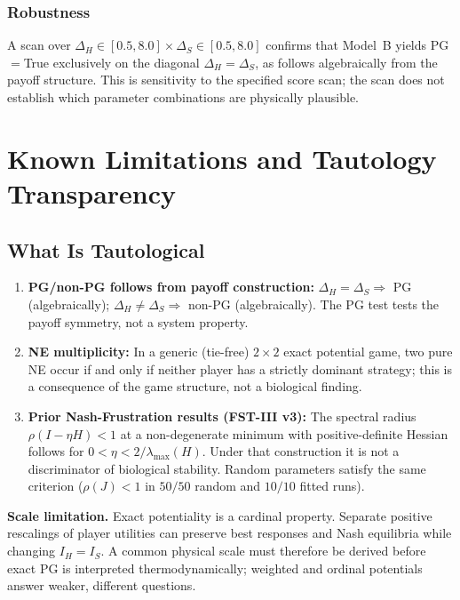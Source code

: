 \documentclass[12pt,a4paper]{article}
\begin{document}
\subsubsection{Robustness}

A scan over $\Delta_H \in [0.5, 8.0] \times \Delta_S \in [0.5, 8.0]$
confirms that Model~B yields PG$=$True exclusively on the diagonal
$\Delta_H = \Delta_S$, as follows algebraically from the payoff
structure. This is sensitivity to the specified score scan; the scan
does not establish which parameter combinations are physically
plausible.


\section{Known Limitations and Tautology Transparency}
\label{sec:tautology}

\subsection{What Is Tautological}

\begin{enumerate}
  \item \textbf{PG/non-PG follows from payoff construction:}
    $\Delta_H = \Delta_S \Rightarrow$ PG (algebraically);
    $\Delta_H \neq \Delta_S \Rightarrow$ non-PG (algebraically).
    The PG test tests the payoff symmetry, not a system property.

  \item \textbf{NE multiplicity:} In a generic (tie-free) $2\times 2$
    exact potential game, two pure NE occur if and only if neither player
    has a strictly dominant strategy; this is a consequence of the game
    structure, not a biological finding.

  \item \textbf{Prior Nash-Frustration results (FST-III v3):} The
    spectral radius $\rho(I-\eta H)<1$ at a non-degenerate minimum with
    positive-definite Hessian follows for
    $0<\eta<2/\lambda_{\max}(H)$. Under that construction it is not a
    discriminator of biological stability. Random parameters satisfy the same criterion
    ($\rho(J)<1$ in $50/50$ random and $10/10$ fitted runs).
\end{enumerate}

\noindent\textbf{Scale limitation.} Exact potentiality is a cardinal
property. Separate positive rescalings of player utilities can preserve
best responses and Nash equilibria while changing $I_H=I_S$. A common
physical scale must therefore be derived before exact PG is interpreted
thermodynamically; weighted and ordinal potentials answer weaker,
different questions.
\end{document}
